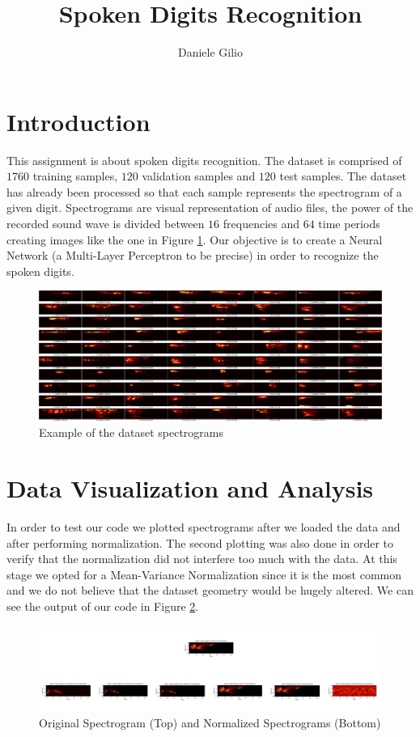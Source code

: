 \documentclass[10pt,a4paper]{report}
\author{Daniele Gilio}
\title{Spoken Digits Recognition}
\begin{document}
\maketitle
\section{Introduction}
This assignment is about spoken digits recognition. The dataset is comprised of $1760$ training samples, $120$ validation samples and $120$ test samples. The dataset has already been processed so that each sample represents the spectrogram of a given digit. Spectrograms are visual representation of audio files, the power of the recorded sound wave is divided between $16$ frequencies and $64$ time periods creating images like the one in Figure \ref{fig:data_spect}. Our objective is to create a Neural Network (a Multi-Layer Perceptron to be precise) in order to recognize the spoken digits.
\begin{figure}[!ht]
\centering
\includegraphics[width=\linewidth]{spoken-digits/spectrograms.png}
\caption{Example of the dataset spectrograms}
\label{fig:data_spect}
\end{figure}
\section{Data Visualization and Analysis}
In order to test our code we plotted spectrograms after we loaded the data and after performing normalization. The second plotting was also done in order to verify that the normalization did not interfere too much with the data. At this stage we opted for a Mean-Variance Normalization since it is the most common and we do not believe that the dataset geometry would be hugely altered. We can see the output of our code in Figure \ref{fig:norm_spect}.
\begin{figure}[!ht]
\centering
\includegraphics[width=\linewidth]{norm_spect.png}
\caption{Original Spectrogram (Top) and Normalized Spectrograms (Bottom)}
\label{fig:norm_spect}
\end{figure}
\end{document}

